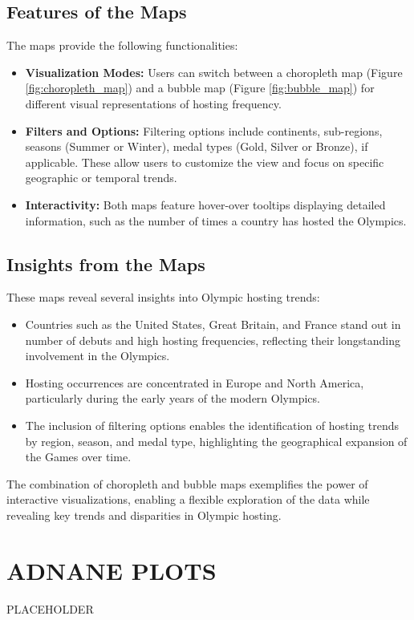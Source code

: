 \subsection{Features of the Maps}

The maps provide the following functionalities:
\begin{itemize}
    \item \textbf{Visualization Modes:} Users can switch between a choropleth map (Figure \ref{fig:choropleth_map}) and a bubble map (Figure \ref{fig:bubble_map}) for different visual representations of hosting frequency.
    \item \textbf{Filters and Options:} Filtering options include continents, sub-regions, seasons (Summer or Winter), medal types (Gold, Silver or Bronze), if applicable. These allow users to customize the view and focus on specific geographic or temporal trends.
    \item \textbf{Interactivity:} Both maps feature hover-over tooltips displaying detailed information, such as the number of times a country has hosted the Olympics.
\end{itemize}

\subsection{Insights from the Maps}

These maps reveal several insights into Olympic hosting trends:
\begin{itemize}
    \item Countries such as the United States, Great Britain, and France stand out in number of debuts and high hosting frequencies, reflecting their longstanding involvement in the Olympics.
    \item Hosting occurrences are concentrated in Europe and North America, particularly during the early years of the modern Olympics.
    \item The inclusion of filtering options enables the identification of hosting trends by region, season, and medal type, highlighting the geographical expansion of the Games over time.
\end{itemize}

The combination of choropleth and bubble maps exemplifies the power of interactive visualizations, enabling a flexible exploration of the data while revealing key trends and disparities in Olympic hosting.

\section{ADNANE PLOTS}

PLACEHOLDER
